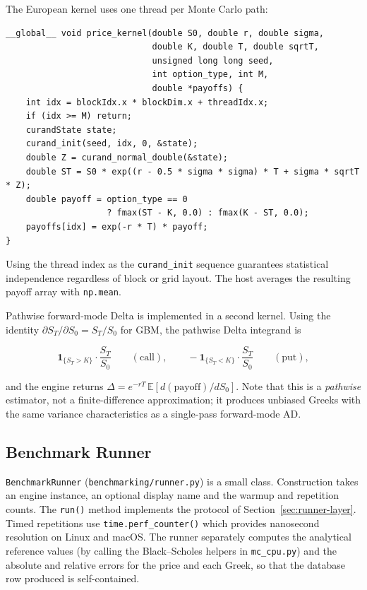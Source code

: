 The European kernel uses one thread per Monte Carlo path:

\begin{verbatim}
__global__ void price_kernel(double S0, double r, double sigma,
                             double K, double T, double sqrtT,
                             unsigned long long seed,
                             int option_type, int M,
                             double *payoffs) {
    int idx = blockIdx.x * blockDim.x + threadIdx.x;
    if (idx >= M) return;
    curandState state;
    curand_init(seed, idx, 0, &state);
    double Z = curand_normal_double(&state);
    double ST = S0 * exp((r - 0.5 * sigma * sigma) * T + sigma * sqrtT * Z);
    double payoff = option_type == 0
                    ? fmax(ST - K, 0.0) : fmax(K - ST, 0.0);
    payoffs[idx] = exp(-r * T) * payoff;
}
\end{verbatim}

Using the thread index as the \texttt{curand\_init} sequence guarantees
statistical independence regardless of block or grid layout. The host averages
the resulting payoff array with \texttt{np.mean}.

Pathwise forward-mode Delta is implemented in a second kernel. Using the
identity $\partial S_T / \partial S_0 = S_T / S_0$ for GBM, the pathwise
Delta integrand is

\[
\mathbf{1}_{\{S_T > K\}} \cdot \frac{S_T}{S_0} \qquad (\text{call}), \qquad
-\mathbf{1}_{\{S_T < K\}} \cdot \frac{S_T}{S_0} \qquad (\text{put}),
\]

and the engine returns
$\Delta = e^{-rT}\,\mathbb{E}[d(\text{payoff})/dS_0]$. Note that this is a
\emph{pathwise} estimator, not a finite-difference approximation; it produces
unbiased Greeks with the same variance characteristics as a single-pass
forward-mode AD.

\subsection{Benchmark Runner}
\label{sec:impl-runner}

\texttt{BenchmarkRunner} (\texttt{benchmarking/runner.py}) is a small class.
Construction takes an engine instance, an optional display name and the warmup
and repetition counts. The \texttt{run()} method implements the protocol of
Section~\ref{sec:runner-layer}. Timed repetitions use \texttt{time.perf\_counter()}
which provides nanosecond resolution on Linux and macOS. The runner separately
computes the analytical reference values (by calling the Black--Scholes helpers
in \texttt{mc\_cpu.py}) and the absolute and relative errors for the price and
each Greek, so that the database row produced is self-contained.

